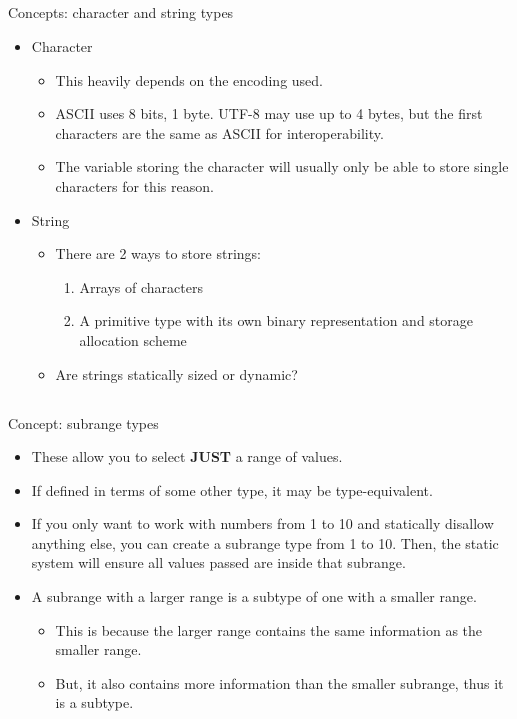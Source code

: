 \subsection{}
Concepts: character and string types

\begin{itemize}
\item Character
  \begin{itemize}[noitemsep]
  \item This heavily depends on the encoding used.
  \item ASCII uses 8 bits, 1 byte. UTF-8 may use up to 4 bytes, but the first characters are the same as ASCII for interoperability.
  \item The variable storing the character will usually only be able to store single characters for this reason.
  \end{itemize}

\item String
  \begin{itemize}[noitemsep]
  \item There are 2 ways to store strings:
    \begin{enumerate}[noitemsep]
    \item Arrays of characters
    \item A primitive type with its own binary representation and storage allocation scheme
    \end{enumerate}
  \item Are strings statically sized or dynamic?
  \end{itemize}
\end{itemize}

\subsection{}
Concept: subrange types

\begin{itemize}[noitemsep]
\item These allow you to select \textbf{JUST} a range of values.
\item If defined in terms of some other type, it may be type-equivalent.
\item If you only want to work with numbers from 1 to 10 and statically disallow anything else, you can create a subrange type from 1 to 10. Then, the static system will ensure all values passed are inside that subrange.
\item A subrange with a larger range is a subtype of one with a smaller range.
  \begin{itemize}[noitemsep]
  \item This is because the larger range contains the same information as the smaller range.
  \item But, it also contains more information than the smaller subrange, thus it is a subtype.
  \end{itemize}
\end{itemize}

